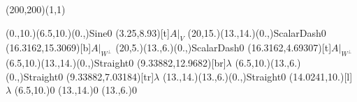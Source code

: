\unitlength=1bp%

\begin{feynartspicture}(200,200)(1,1)

\FADiagram{}
\FAProp(0.,10.)(6.5,10.)(0.,){Sine}{0}
\FALabel(3.25,8.93)[t]{$A|_V$}
\FAProp(20,15.)(13.,14.)(0.,){ScalarDash}{0}
\FALabel(16.3162,15.3069)[b]{$A|_{W^\perp}$}
\FAProp(20,5.)(13.,6.)(0.,){ScalarDash}{0}
\FALabel(16.3162,4.69307)[t]{$A|_{W^\perp}$}
\FAProp(6.5,10.)(13.,14.)(0.,){Straight}{0}
\FALabel(9.33882,12.9682)[br]{$\lambda$}
\FAProp(6.5,10.)(13.,6.)(0.,){Straight}{0}
\FALabel(9.33882,7.03184)[tr]{$\lambda$}
\FAProp(13.,14.)(13.,6.)(0.,){Straight}{0}
\FALabel(14.0241,10.)[l]{$\lambda$}
\FAVert(6.5,10.){0}
\FAVert(13.,14.){0}
\FAVert(13.,6.){0}
\end{feynartspicture}

